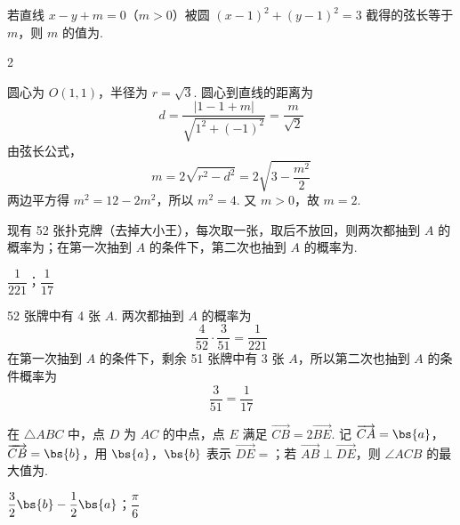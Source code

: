 \begin{problem}
若直线 \(x-y+m=0\)（\(m>0\)）被圆 \((x-1)^2+(y-1)^2=3\) 截得的弦长等于 \(m\)，则 \(m\) 的值为\fillinblank{}.
\end{problem}

\begin{answer}
2
\end{answer}

\begin{solution}
圆心为 \(O(1,1)\)，半径为 \(r=\sqrt3\). 圆心到直线的距离为
\[
d=\frac{|1-1+m|}{\sqrt{1^2+(-1)^2}}=\frac{m}{\sqrt2}
\]
由弦长公式，
\[
m=2\sqrt{r^2-d^2}=2\sqrt{3-\frac{m^2}{2}}
\]
两边平方得 \(m^2=12-2m^2\)，所以 \(m^2=4\). 又 \(m>0\)，故 \(m=2\).
\end{solution}

\begin{problem}
现有 52 张扑克牌（去掉大小王），每次取一张，取后不放回，则两次都抽到 \(A\) 的概率为\fillinblank{}；在第一次抽到 \(A\) 的条件下，第二次也抽到 \(A\) 的概率为\fillinblank{}.
\end{problem}

\begin{answer}
\(\dfrac{1}{221}\)；\(\dfrac{1}{17}\)
\end{answer}

\begin{solution}
52 张牌中有 4 张 \(A\). 两次都抽到 \(A\) 的概率为
\[
\frac4{52}\cdot\frac3{51}=\frac1{221}
\]
在第一次抽到 \(A\) 的条件下，剩余 51 张牌中有 3 张 \(A\)，所以第二次也抽到 \(A\) 的条件概率为
\[
\frac3{51}=\frac1{17}
\]
\end{solution}

\begin{problem}
在 \(\triangle ABC\) 中，点 \(D\) 为 \(AC\) 的中点，点 \(E\) 满足 \(\overrightarrow{CB}=2\overrightarrow{BE}\). 记 \(\overrightarrow{CA}=\bs{a}\)，\(\overrightarrow{CB}=\bs{b}\)，用 \(\bs{a}\)，\(\bs{b}\) 表示 \(\overrightarrow{DE}=\)\fillinblank{}；若 \(\overrightarrow{AB}\perp\overrightarrow{DE}\)，则 \(\angle ACB\) 的最大值为\fillinblank{}.
\end{problem}

\begin{answer}
\(\dfrac{3}{2}\bs{b}-\dfrac{1}{2}\bs{a}\)；\(\dfrac{\pi}{6}\)
\end{answer}

